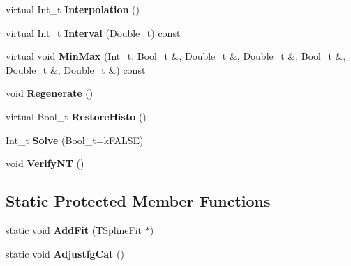 \begin{DoxyCompactItemize}
\item 
\hypertarget{classTSplineFit_a0ab47b5bc63307de9831aaf0923e2867}{virtual Int\-\_\-t {\bfseries Interpolation} ()}\label{classTSplineFit_a0ab47b5bc63307de9831aaf0923e2867}

\item 
\hypertarget{classTSplineFit_a225e0e00bf8600ce87e43556398a83db}{virtual Int\-\_\-t {\bfseries Interval} (Double\-\_\-t) const }\label{classTSplineFit_a225e0e00bf8600ce87e43556398a83db}

\item 
\hypertarget{classTSplineFit_a2f8fb35341ba411cf350425365910161}{virtual void {\bfseries Min\-Max} (Int\-\_\-t, Bool\-\_\-t \&, Double\-\_\-t \&, Double\-\_\-t \&, Bool\-\_\-t \&, Double\-\_\-t \&, Double\-\_\-t \&) const }\label{classTSplineFit_a2f8fb35341ba411cf350425365910161}

\item 
\hypertarget{classTSplineFit_a3ddcae27148502859d3ab79ef05c2c4e}{void {\bfseries Regenerate} ()}\label{classTSplineFit_a3ddcae27148502859d3ab79ef05c2c4e}

\item 
\hypertarget{classTSplineFit_a91c3fdb511835006a016a465cf1f46c3}{virtual Bool\-\_\-t {\bfseries Restore\-Histo} ()}\label{classTSplineFit_a91c3fdb511835006a016a465cf1f46c3}

\item 
\hypertarget{classTSplineFit_a1f62f0b369cc0f0e04b3b0e590fe56ec}{Int\-\_\-t {\bfseries Solve} (Bool\-\_\-t=k\-F\-A\-L\-S\-E)}\label{classTSplineFit_a1f62f0b369cc0f0e04b3b0e590fe56ec}

\item 
\hypertarget{classTSplineFit_aa2975f780cc629ba30dd5511c53fdb98}{void {\bfseries Verify\-N\-T} ()}\label{classTSplineFit_aa2975f780cc629ba30dd5511c53fdb98}

\end{DoxyCompactItemize}
\subsection*{Static Protected Member Functions}
\begin{DoxyCompactItemize}
\item 
\hypertarget{classTSplineFit_a917d6ec70911edd89a553156f575cec5}{static void {\bfseries Add\-Fit} (\hyperlink{classTSplineFit}{T\-Spline\-Fit} $\ast$)}\label{classTSplineFit_a917d6ec70911edd89a553156f575cec5}

\item 
\hypertarget{classTSplineFit_aff26e68d0b5782178b89228dd30b918e}{static void {\bfseries Adjustfg\-Cat} ()}\label{classTSplineFit_aff26e68d0b5782178b89228dd30b918e}

\end{DoxyCompactItemize}
